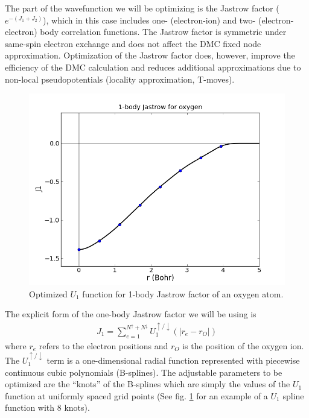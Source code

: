 The part of the wavefunction we will be optimizing is the Jastrow factor 
($e^{-(J_1+J_2)}$), which in this case includes one- (electron-ion) and two- 
(electron-electron) body correlation functions.  The Jastrow factor is symmetric 
under same-spin electron exchange and does not affect the DMC fixed node 
approximation.  Optimization of the Jastrow factor does, however, improve the 
efficiency of the DMC calculation and reduces additional approximations due to 
non-local pseudopotentials (locality approximation, T-moves).  


\begin{figure}
\begin{center}
\includegraphics[trim = 0mm 0mm 0mm 0mm, clip,width=0.75\columnwidth]{./figures/lab_qmc_basics_J1}
\end{center}
\caption{Optimized $U_1$ function for 1-body Jastrow factor of an oxygen atom.
\label{fig:u1_spline}
}
\end{figure}

The explicit form of the one-body Jastrow factor we will be using is
\begin{align}\label{eq:J1}
  J_1 = \sum_{e=1}^{N^\uparrow+N^\downarrow}U_1^{\uparrow/\downarrow}(|r_e-r_O|)
\end{align}
where $r_e$ refers to the electron positions and $r_O$ is 
the position of the oxygen ion.  The $U_1^{\uparrow/\downarrow}$ term is a 
one-dimensional radial function represented with piecewise continuous cubic 
polynomials (B-splines).  The adjustable parameters to be optimized are the 
``knots'' of the B-splines which are simply the values of the $U_1$ function at 
uniformly spaced grid points (See fig. \ref{fig:u1_spline} for an example of a $U_1$ 
spline function with 8 knots).  

